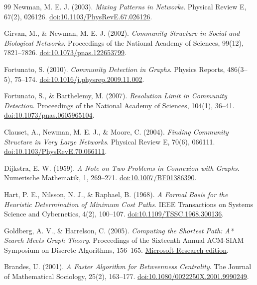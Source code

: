 ﻿\documentclass[a4paper,12pt]{report}
\begin{document}
\begin{thebibliography}{99}
Newman, M. E. J. (2003). \textit{Mixing Patterns in Networks}. Physical Review E, 67(2), 026126. \href{https://doi.org/10.1103/PhysRevE.67.026126}{doi:10.1103/PhysRevE.67.026126}.

Girvan, M., \& Newman, M. E. J. (2002). \textit{Community Structure in Social and Biological Networks}. Proceedings of the National Academy of Sciences, 99(12), 7821--7826. \href{https://doi.org/10.1073/pnas.122653799}{doi:10.1073/pnas.122653799}.

Fortunato, S. (2010). \textit{Community Detection in Graphs}. Physics Reports, 486(3--5), 75--174. \href{https://doi.org/10.1016/j.physrep.2009.11.002}{doi:10.1016/j.physrep.2009.11.002}.

Fortunato, S., \& Barthelemy, M. (2007). \textit{Resolution Limit in Community Detection}. Proceedings of the National Academy of Sciences, 104(1), 36--41. \href{https://doi.org/10.1073/pnas.0605965104}{doi:10.1073/pnas.0605965104}.

Clauset, A., Newman, M. E. J., \& Moore, C. (2004). \textit{Finding Community Structure in Very Large Networks}. Physical Review E, 70(6), 066111. \href{https://doi.org/10.1103/PhysRevE.70.066111}{doi:10.1103/PhysRevE.70.066111}.

Dijkstra, E. W. (1959). \textit{A Note on Two Problems in Connexion with Graphs}. Numerische Mathematik, 1, 269--271. \href{https://doi.org/10.1007/BF01386390}{doi:10.1007/BF01386390}.

Hart, P. E., Nilsson, N. J., \& Raphael, B. (1968). \textit{A Formal Basis for the Heuristic Determination of Minimum Cost Paths}. IEEE Transactions on Systems Science and Cybernetics, 4(2), 100--107. \href{https://doi.org/10.1109/TSSC.1968.300136}{doi:10.1109/TSSC.1968.300136}.

Goldberg, A. V., \& Harrelson, C. (2005). \textit{Computing the Shortest Path: A* Search Meets Graph Theory}. Proceedings of the Sixteenth Annual ACM-SIAM Symposium on Discrete Algorithms, 156--165. \href{https://www.microsoft.com/en-us/research/publication/computing-the-shortest-path-a-search-meets-graph-theory/}{Microsoft Research edition}.

Brandes, U. (2001). \textit{A Faster Algorithm for Betweenness Centrality}. The Journal of Mathematical Sociology, 25(2), 163--177. \href{https://doi.org/10.1080/0022250X.2001.9990249}{doi:10.1080/0022250X.2001.9990249}.


\end{thebibliography}
\end{document}
